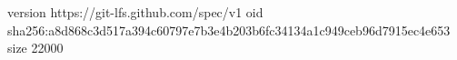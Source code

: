 version https://git-lfs.github.com/spec/v1
oid sha256:a8d868c3d517a394c60797e7b3e4b203b6fc34134a1c949ceb96d7915ec4e653
size 22000
